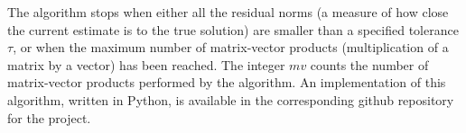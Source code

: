 \noindent The algorithm stops when either all the residual norms (a measure of how close the current estimate is to the true solution) are smaller than a specified tolerance $\tau$, or when the maximum number of matrix-vector products (multiplication of a matrix by a vector) has been reached. The integer $mv$ counts the number of matrix-vector products performed by the algorithm. An implementation of this algorithm, written in Python, is available in the corresponding github repository for the project. 

\clearpage